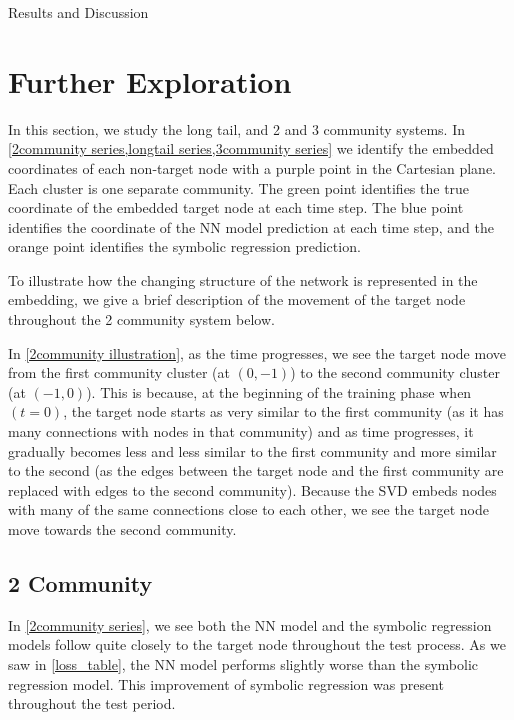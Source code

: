 \documentclass[12pt]{amsbook}
\begin{document}
\begin{chapter}{Results and Discussion}
    \section{Further Exploration}
        In this section, we study the long tail, and 2 and 3 community systems. 
        In \cref{2community series,longtail series,3community series} we identify the embedded coordinates of each non-target node with a purple point in the Cartesian plane. Each cluster is one separate community. The green point identifies the true coordinate of the embedded target node at each time step. The blue point identifies the coordinate of the NN model prediction at each time step, and the orange point identifies the symbolic regression prediction. 
        
        To illustrate how the changing structure of the network is represented in the embedding, we give a brief description of the movement of the target node throughout the 2 community system below.

        In \cref{2community illustration}, as the time progresses, we see the target node move from the first community cluster (at $(0,-1)$) to the second community cluster (at $(-1,0)$). This is because, at the beginning of the training phase when $(t=0)$, the target node starts as very similar to the first community (as it has many connections with nodes in that community) and as time progresses, it gradually becomes less and less similar to the first community and more similar to the second (as the edges between the target node and the first community are replaced with edges to the second community). Because the SVD embeds nodes with many of the same connections close to each other, we see the target node move towards the second community.

        \subsection{2 Community}
            In \cref{2community series}, we see both the NN model and the symbolic regression models follow quite closely to the target node throughout the test process. As we saw in \cref{loss_table}, the NN model performs slightly worse than the symbolic regression model. This improvement of symbolic regression was present throughout the test period.

            \begin{figure}
                \setlength{\textwidth}{1.2\textwidth}
                
                \begin{subfigure}[p]{0.35\textwidth}


\end{subfigure}
\end{figure}
\end{chapter}
\end{document}
